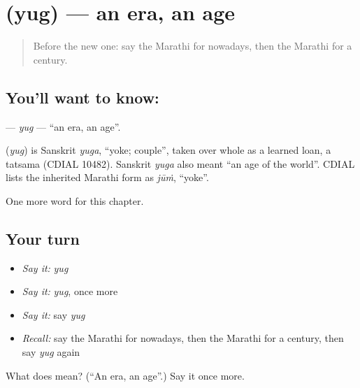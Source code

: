 \section[\texorpdfstring{\mr{युग} (yug)}{युग (yug)}]{ (yug) — an era, an age}

\label{lesson:MR-C258-yug}



\begin{quote}
Before the new one: say the Marathi for nowadays, then the Marathi for a century.
\end{quote}

\subsection*{You'll want to know: }
\textbf{} — \emph{yug} — \textquotedblleft{}an era, an age\textquotedblright{}.

\begin{cousinweb}
\textbf{} (\emph{yug}) is Sanskrit \emph{yuga}, \textquotedblleft{}yoke; couple\textquotedblright{}, taken over whole as a learned loan, a tatsama (CDIAL 10482). Sanskrit \emph{yuga} also meant \textquotedblleft{}an age of the world\textquotedblright{}. CDIAL lists the inherited Marathi form as \emph{jūṁ}, \textquotedblleft{}yoke\textquotedblright{}.
\end{cousinweb}

\begin{grammarlens}[title={What you've built}]
One more word for this chapter.
\end{grammarlens}

\subsection*{Your turn}
\begin{itemize}
\raggedright
  \item \emph{Say it:} \emph{yug}
  \item \emph{Say it:} \emph{yug}, once more
  \item \emph{Say it:} say \emph{yug}
  \item \emph{Recall:} say the Marathi for nowadays, then the Marathi for a century, then say \emph{yug} again
\end{itemize}

\begin{tcolorbox}[breakable,colback=teal!4,colframe=teal!35!black,title={Before you move on}]
What does  mean? (\textquotedblleft{}An era, an age\textquotedblright{}.) Say it once more.
\end{tcolorbox}
